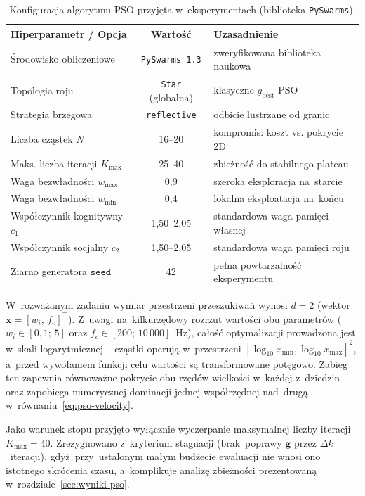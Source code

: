 \begin{table}[h!]
    \centering
    \caption{Konfiguracja algorytmu PSO przyjęta w~eksperymentach (biblioteka \texttt{PySwarms}).}
    \label{tab:pso-hparams}
    \begin{tabular}{lcl}
        \toprule
        \textbf{Hiperparametr / Opcja} & \textbf{Wartość} & \textbf{Uzasadnienie} \\
        \midrule
        Środowisko obliczeniowe      & \texttt{PySwarms 1.3} & zweryfikowana biblioteka naukowa \\
        Topologia roju               & \texttt{Star} (globalna) & klasyczne $g_{\mathrm{best}}$ PSO \\
        Strategia brzegowa           & \texttt{reflective}  & odbicie lustrzane od granic \\
        Liczba cząstek $N$           & 16--20    & kompromis: koszt vs. pokrycie 2D \\
        Maks. liczba iteracji $K_{\max}$ & 25--40 & zbieżność do stabilnego plateau \\
        Waga bezwładności $w_{\max}$ & 0{,}9     & szeroka eksploracja na~starcie \\
        Waga bezwładności $w_{\min}$ & 0{,}4     & lokalna eksploatacja na~końcu \\
        Współczynnik kognitywny $c_1$ & 1{,}50--2{,}05 & standardowa waga pamięci własnej \\
        Współczynnik socjalny $c_2$  & 1{,}50--2{,}05 & standardowa waga pamięci roju \\
        Ziarno generatora $\texttt{seed}$ & 42   & pełna powtarzalność eksperymentu \\
        \bottomrule
    \end{tabular}
\end{table}

W~rozważanym zadaniu wymiar przestrzeni przeszukiwań wynosi $d=2$ (wektor $\mathbf{x}=[w_i,\,f_c]^\top$). Z~uwagi na~kilkurzędowy rozrzut wartości obu parametrów ($w_i\in[0{,}1;\,5]$ oraz $f_c\in[200;\,10\,000]$~Hz), całość optymalizacji prowadzona jest w~skali logarytmicznej -- cząstki operują w~przestrzeni $[\log_{10} x_{\min}, \log_{10} x_{\max}]^2$, a~przed wywołaniem funkcji celu wartości są transformowane potęgowo. Zabieg ten zapewnia równoważne pokrycie obu rzędów wielkości w~każdej z~dziedzin oraz zapobiega numerycznej dominacji jednej współrzędnej nad~drugą w~równaniu~\eqref{eq:pso-velocity}.

Jako warunek stopu przyjęto wyłącznie wyczerpanie maksymalnej liczby iteracji $K_{\max}=40$. Zrezygnowano z~kryterium stagnacji (brak~poprawy $\mathbf{g}$ przez $\Delta k$~iteracji), gdyż~przy~ustalonym małym budżecie ewaluacji nie wnosi ono istotnego skrócenia czasu, a~komplikuje analizę zbieżności prezentowaną w~rozdziale~\ref{sec:wyniki-pso}.

